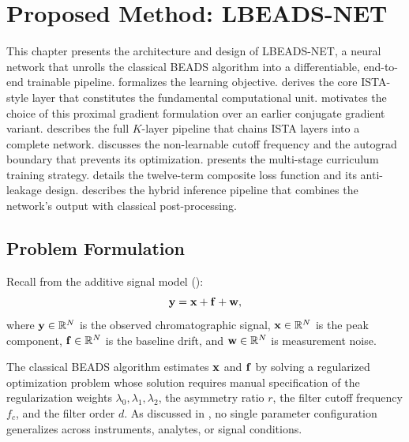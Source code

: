 \chapter{Proposed Method: LBEADS-NET}
\label{chap:method}

This chapter presents the architecture and design of LBEADS-NET, a neural network that unrolls the classical BEADS algorithm into a differentiable, end-to-end trainable pipeline.  formalizes the learning objective.  derives the core ISTA-style layer that constitutes the fundamental computational unit.  motivates the choice of this proximal gradient formulation over an earlier conjugate gradient variant.  describes the full $K$-layer pipeline that chains ISTA layers into a complete network.  discusses the non-learnable cutoff frequency and the autograd boundary that prevents its optimization.  presents the multi-stage curriculum training strategy.  details the twelve-term composite loss function and its anti-leakage design.  describes the hybrid inference pipeline that combines the network's output with classical post-processing.


\section{Problem Formulation}
\label{sec:method_formulation}

Recall from  the additive signal model ():
\begin{equation}
    \mathbf{y} = \mathbf{x} + \mathbf{f} + \mathbf{w},
\end{equation}
where $\mathbf{y} \in {\mathbb R}^N$ is the observed chromatographic signal, $\mathbf{x} \in {\mathbb R}^N$ is the peak component, $\mathbf{f} \in {\mathbb R}^N$ is the baseline drift, and $\mathbf{w} \in {\mathbb R}^N$ is measurement noise.

The classical BEADS algorithm estimates $\mathbf{x}$ and $\mathbf{f}$ by solving a regularized optimization problem whose solution requires manual specification of the regularization weights $\lambda_0, \lambda_1, \lambda_2$, the asymmetry ratio $r$, the filter cutoff frequency $f_c$, and the filter order $d$. As discussed in , no single parameter configuration generalizes across instruments, analytes, or signal conditions.

